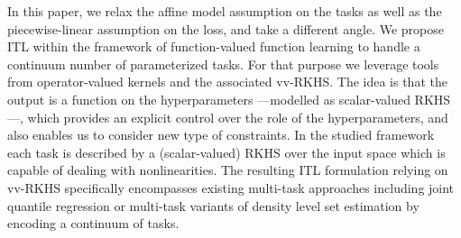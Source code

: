%
%
%
%

In this paper, we relax the affine model assumption on the tasks as well as
the piecewise-linear assumption on the loss, and take a different angle. We
propose \acf{ITL} within the framework of function-valued function learning to
handle a continuum number of parameterized tasks. For that purpose we leverage
tools from operator-valued kernels and the associated \acf{vv-RKHS}. The idea
is that the output is a function on the hyperparameters ---modelled as
scalar-valued \ac{RKHS}---, which provides an explicit control over the role of the
hyperparameters, and also enables us to consider new type of constraints. In
the studied framework each task is described by  a (scalar-valued) \ac{RKHS}
over the input space which is capable of dealing with nonlinearities.
The resulting \acs{ITL} formulation relying on \ac{vv-RKHS} specifically encompasses
existing multi-task approaches including joint quantile regression
\citep{sangnier2016joint} or multi-task variants of density level set
estimation \citep{glazer2013q} by encoding a continuum of tasks.

